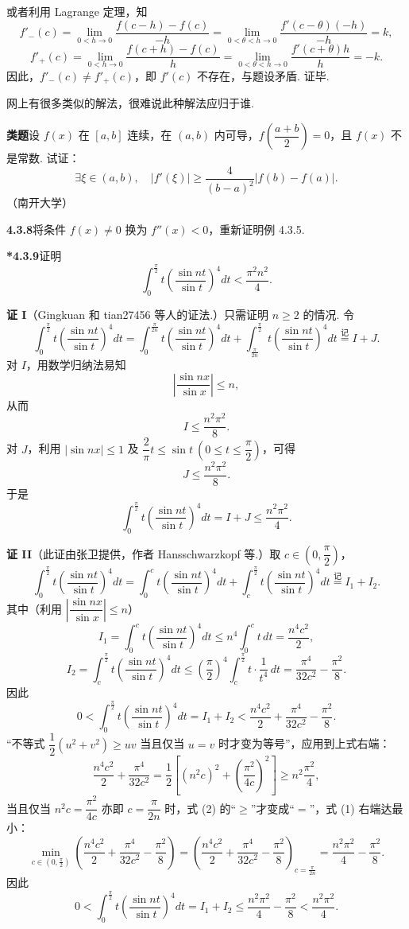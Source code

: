 \documentclass[UTF8,12pt,a4paper,fontset=fandol]{ctexart}
\begin{document}
或者利用 Lagrange 定理，知
\[
f'_-(c)=\lim_{0<h\to0}\frac{f(c-h)-f(c)}{-h}
=\lim_{0<\theta<h\to0}\frac{f'(c-\theta)(-h)}{-h}=k,
\]
\[
f'_+(c)=\lim_{0<h\to0}\frac{f(c+h)-f(c)}{h}
=\lim_{0<\theta<h\to0}\frac{f'(c+\theta)h}{h}=-k.
\]
因此，$f'_-(c)\ne f'_+(c)$，即 $f'(c)$ 不存在，与题设矛盾. 证毕.

网上有很多类似的解法，很难说此种解法应归于谁.

\noindent\textbf{类题}\quad 设 $f(x)$ 在 $[a,b]$ 连续，在 $(a,b)$ 内可导，$f\left(\dfrac{a+b}2\right)=0$，且 $f(x)$ 不是常数. 试证：
\[
\exists\xi\in(a,b),\quad
|f'(\xi)|\ge\frac4{(b-a)^2}|f(b)-f(a)|.
\]
（南开大学）

\noindent\textbf{4.3.8}\quad 将条件 $f(x)\ne0$ 换为 $f''(x)<0$，重新证明例 4.3.5.

\noindent\textbf{*4.3.9}\quad 证明
\[
\int_0^{\frac\pi2}t\left(\frac{\sin nt}{\sin t}\right)^4dt<\frac{\pi^2n^2}{4}.
\]

\noindent\textbf{证 I}\quad （Gingkuan 和 tian27456 等人的证法.）只需证明 $n\ge2$ 的情况. 令
\[
\int_0^{\frac\pi2}t\left(\frac{\sin nt}{\sin t}\right)^4dt
=\int_0^{\frac\pi{2n}}t\left(\frac{\sin nt}{\sin t}\right)^4dt
+\int_{\frac\pi{2n}}^{\frac\pi2}t\left(\frac{\sin nt}{\sin t}\right)^4dt
\stackrel{\text{记}}{=}I+J.
\]
对 $I$，用数学归纳法易知
\[
\left|\frac{\sin nx}{\sin x}\right|\le n,
\]
从而
\[
I\le\frac{n^2\pi^2}{8}.
\]
对 $J$，利用 $|\sin nx|\le1$ 及 $\dfrac2\pi t\le\sin t\ (0\le t\le\dfrac\pi2)$，可得
\[
J\le\frac{n^2\pi^2}{8}.
\]
于是
\[
\int_0^{\frac\pi2}t\left(\frac{\sin nt}{\sin t}\right)^4dt
=I+J\le\frac{n^2\pi^2}{4}.
\]

\noindent\textbf{证 II}\quad （此证由张卫提供，作者 Hansschwarzkopf 等.）取 $c\in\left(0,\dfrac\pi2\right)$，
\[
\int_0^{\frac\pi2}t\left(\frac{\sin nt}{\sin t}\right)^4dt
=\int_0^c t\left(\frac{\sin nt}{\sin t}\right)^4dt
+\int_c^{\frac\pi2}t\left(\frac{\sin nt}{\sin t}\right)^4dt
\stackrel{\text{记}}{=}I_1+I_2.
\]
其中（利用 $\left|\dfrac{\sin nx}{\sin x}\right|\le n$）
\[
I_1=\int_0^c t\left(\frac{\sin nt}{\sin t}\right)^4dt
\le n^4\int_0^c t\,dt=\frac{n^4c^2}{2},
\]
\[
I_2=\int_c^{\frac\pi2}t\left(\frac{\sin nt}{\sin t}\right)^4dt
\le\left(\frac\pi2\right)^4\int_c^{\frac\pi2}t\cdot\frac1{t^4}\,dt
=\frac{\pi^4}{32c^2}-\frac{\pi^2}{8}.
\]
因此
\[
0<\int_0^{\frac\pi2}t\left(\frac{\sin nt}{\sin t}\right)^4dt
=I_1+I_2<\frac{n^4c^2}{2}+\frac{\pi^4}{32c^2}-\frac{\pi^2}{8}.
\tag{1}
\]
“不等式 $\dfrac12(u^2+v^2)\ge uv$ 当且仅当 $u=v$ 时才变为等号”，应用到上式右端：
\[
\frac{n^4c^2}{2}+\frac{\pi^4}{32c^2}
=\frac12\left[(n^2c)^2+\left(\frac{\pi^2}{4c}\right)^2\right]\ge n^2\frac{\pi^2}{4},
\tag{2}
\]
当且仅当 $n^2c=\dfrac{\pi^2}{4c}$ 亦即 $c=\dfrac\pi{2n}$ 时，式 (2) 的“$\ge$”才变成“$=$”，式 (1) 右端达最小：
\[
\min_{c\in(0,\frac\pi2)}
\left(\frac{n^4c^2}{2}+\frac{\pi^4}{32c^2}-\frac{\pi^2}{8}\right)
=\left(\frac{n^4c^2}{2}+\frac{\pi^4}{32c^2}-\frac{\pi^2}{8}\right)_{c=\frac\pi{2n}}
=\frac{n^2\pi^2}{4}-\frac{\pi^2}{8}.
\]
因此
\[
0<\int_0^{\frac\pi2}t\left(\frac{\sin nt}{\sin t}\right)^4dt
=I_1+I_2\le\frac{n^2\pi^2}{4}-\frac{\pi^2}{8}
<\frac{n^2\pi^2}{4}.
\]
\end{document}
